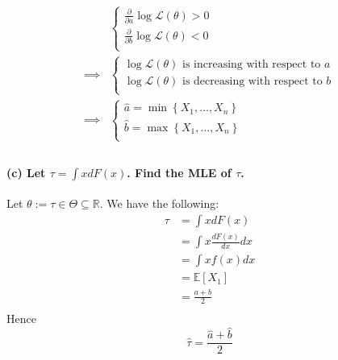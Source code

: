 \documentclass{article}
\newcommand{\E}{\mathbb{E}}
\newcommand{\R}{\mathbb{R}}
\renewcommand{\L}{\mathcal{L}}
\begin{document}
\begin{align*}
             & \begin{cases}
        \frac{\partial}{\partial a} \log \L (\theta) > 0 \\
        \frac{\partial}{\partial b} \log \L (\theta) < 0 \\
    \end{cases} \\
    \implies &
    \begin{cases}
        \log \L (\theta) \text{ is increasing with respect to } a \\
        \log \L (\theta) \text{ is decreasing with respect to } b \\
    \end{cases}            \\
    \implies &
    \begin{cases}
        \hat a = \min \left\{X_1, \ldots, X_n\right\} \\
        \hat b = \max \left\{X_1, \ldots, X_n\right\} \\
    \end{cases}            \\
\end{align*}


\paragraph{(c) Let $\tau=\int x d F(x)$. Find the MLE of $\tau$.\\}
Let \(\theta := \tau \in \Theta \subseteq \R\). We have the following:
\begin{align*}
    \tau
     & = \int x d F(x)               \\
     & = \int x \frac{d F(x)}{dx} dx \\
     & = \int x f(x) dx              \\
     & = \E[X_1]                     \\
     & = \frac{a + b}{2}             \\
\end{align*}
Hence
\begin{equation*}
    \hat\tau = \frac{\hat a + \hat b}{2}
\end{equation*}
\end{document}
